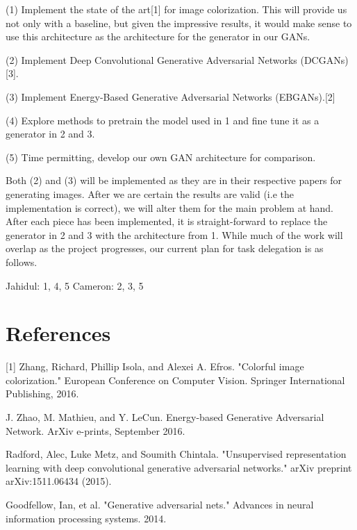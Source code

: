 \documentclass{article}
\begin{document}
\vspace{2pt}
(1) Implement the state of the art[1] for image colorization. This will provide
\indent us not only with a baseline, but given the impressive results, it would make
\indent sense to use this architecture as the architecture for the generator in our
\indent GANs.

\vspace{3pt}
(2) Implement Deep Convolutional Generative Adversarial Networks \newline
\indent (DCGANs)[3]. 

\vspace{3pt}
(3) Implement Energy-Based Generative Adversarial Networks (EBGANs).[2]

\vspace{3pt}
(4) Explore methods to pretrain the model used in 1 and fine tune it as a
\indent generator in 2 and 3.

(5) Time permitting, develop our own GAN architecture for comparison.

\vspace{4pt}

\noindent Both (2) and (3) will be implemented as they are in their respective papers for generating
images. After we are certain the results are valid (i.e the implementation is correct), we will alter
them for the main problem at hand. After each piece has been implemented, it is straight-forward to
replace the generator in 2 and 3 with the architecture from 1. While much of the work will overlap as the
project progresses, our current plan for task delegation is as follows. \newline

\noindent Jahidul: 1, 4, 5 \newline
\noindent Cameron: 2, 3, 5



\section{References}
[1] Zhang, Richard, Phillip Isola, and Alexei A. Efros. "Colorful image colorization." 
European Conference on Computer Vision. Springer International Publishing, 2016.
\vspace{2pt}

\noindent [2] J. Zhao, M. Mathieu, and Y. LeCun.  Energy-based Generative Adversarial 
Network. ArXiv e-prints, September 2016.
\vspace{2pt}

\noindent [3] Radford, Alec, Luke Metz, and Soumith Chintala. "Unsupervised representation learning with deep
convolutional generative adversarial networks." arXiv preprint arXiv:1511.06434 (2015).

\noindent [4] Goodfellow, Ian, et al. "Generative adversarial nets." Advances in neural information processing systems. 2014.
\end{document}
